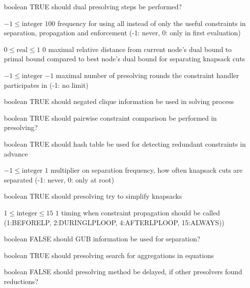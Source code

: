 %
{boolean}%
{TRUE}%
{should dual presolving steps be performed?}%
{}

%
{$-1\leq\textrm{integer}$}%
{$100$}%
{frequency for using all instead of only the useful constraints in separation, propagation and enforcement (-1: never, 0: only in first evaluation)}%
{}

%
{$0\leq\textrm{real}\leq1$}%
{$0$}%
{maximal relative distance from current node's dual bound to primal bound compared to best node's dual bound for separating knapsack cuts}%
{}

%
{$-1\leq\textrm{integer}$}%
{$-1$}%
{maximal number of presolving rounds the constraint handler participates in (-1: no limit)}%
{}

%
{boolean}%
{TRUE}%
{should negated clique information be used in solving process}%
{}

%
{boolean}%
{TRUE}%
{should pairwise constraint comparison be performed in presolving?}%
{}

%
{boolean}%
{TRUE}%
{should hash table be used for detecting redundant constraints in advance}%
{}

%
{$-1\leq\textrm{integer}$}%
{$1$}%
{multiplier on separation frequency, how often knapsack cuts are separated (-1: never, 0: only at root)}%
{}

%
{boolean}%
{TRUE}%
{should presolving try to simplify knapsacks}%
{}

%
{$1\leq\textrm{integer}\leq15$}%
{$1$}%
{timing when constraint propagation should be called (1:BEFORELP, 2:DURINGLPLOOP, 4:AFTERLPLOOP, 15:ALWAYS))}%
{}

%
{boolean}%
{FALSE}%
{should GUB information be used for separation?}%
{}

%
{boolean}%
{TRUE}%
{should presolving search for aggregations in equations}%
{}

%
{boolean}%
{FALSE}%
{should presolving method be delayed, if other presolvers found reductions?}%
{}

